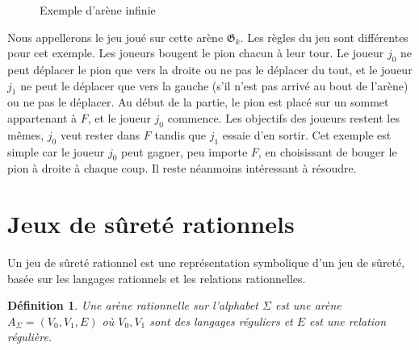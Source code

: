 \documentclass[12pt,a4paper,oneside,titlepage]{report}
\newtheorem{defi}{D\'efinition}[section]
\begin{document}
\begin{figure}[H]
\centering
{}
\caption{Exemple d'arène infinie}
\label{fig:infinite-arena}
\end{figure}
\noindent Nous appellerons le jeu joué sur cette arène $\mathfrak{G}_k$. Les règles du jeu sont différentes pour cet exemple. Les joueurs bougent le pion chacun à leur tour. Le joueur $j_0$ ne peut déplacer le pion que vers la droite ou ne pas le déplacer du tout, et le joueur $j_1$ ne peut le déplacer que vers la gauche (s'il n'est pas arrivé au bout de l'arène) ou ne pas le déplacer. Au début de la partie, le pion est placé sur un sommet appartenant à $F$, et le joueur $j_0$ commence. Les objectifs des joueurs restent les mêmes, $j_0$ veut rester dans $F$ tandis que $j_1$ essaie d'en sortir. Cet exemple est simple car le joueur $j_0$ peut gagner, peu importe $F$, en choisissant de bouger le pion à droite à chaque coup. Il reste néanmoins intéressant à résoudre.

\section{Jeux de sûreté rationnels}
Un jeu de sûreté rationnel est une représentation symbolique d'un jeu de sûreté, basée sur les langages rationnels et les relations rationnelles.
\begin{defi}
Une \emph{arène rationnelle} sur l'alphabet $\Sigma$ est une arène $A_\Sigma=(V_0,V_1,E)$ où $V_0,V_1$ sont des langages réguliers et $E$ est une relation régulière.
\end{defi}
\end{document}
